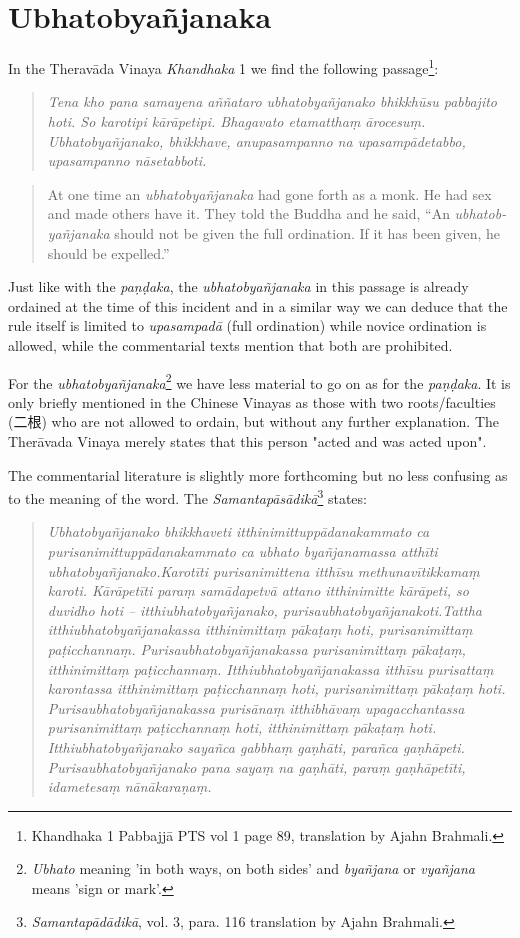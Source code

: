\section{Ubhatob­yañ­janaka}
In the Theravāda Vinaya {\em Khandhaka} 1 we find the following passage\footnote{Khandhaka 1 Pabbajjā PTS vol 1 page 89, translation by Ajahn Brahmali.}:

\begin{quote}
{\em Tena kho pana samayena aññataro ubhatobyañjanako bhikkhūsu pabbajito hoti. So karotipi kārāpetipi. Bhagavato etamatthaṃ ārocesuṃ. Ubhatobyañjanako, bhikkhave, anupasampanno na upasampādetabbo, upasampanno nāsetabboti.}
\end{quote}

\begin{quote}
At one time an {\em ubhatob­yañ­janaka} had gone forth as a monk. He had sex and made others have it. They told the Buddha and he said, “An {\em ubhatob­yañ­janaka} should not be given the full ordination. If it has been given, he should be expelled.”
\end{quote}

Just like with the {\em paṇḍaka}, the {\em ubhatob­yañ­janaka} in this passage is already ordained at the time of this incident and in a similar way we can deduce that the rule itself is limited to {\em upasampadā} (full ordination) while novice ordination is allowed, while the commentarial texts mention that both are prohibited.

For the {\em ubhatob­yañ­janaka}\footnote{{\em Ubhato} meaning 'in both ways, on both sides' and {\em byañjana} or {\em vyañjana} means 'sign or mark'.} we have less material to go on as for the {\em paṇḍaka}. It is only briefly mentioned in the Chinese Vinayas as those with two roots/faculties (二根) who are not allowed to ordain, but without any further explanation. The Therāvada Vinaya merely states that this person "acted and was acted upon". 

The commentarial literature is slightly more forthcoming but no less confusing as to the meaning of the word. The {\em Samantapāsādikā}\footnote{{\em Samantapādādikā}, vol. 3, para. 116 translation by Ajahn Brahmali.} states:

\begin{quote}
{\em Ubhatobyañjanako bhikkhaveti itthinimittuppādanakammato ca purisanimittuppādanakammato ca ubhato byañjanamassa atthīti ubhatobyañjanako.Karotīti purisanimittena itthīsu methunavītikkamaṃ karoti. Kārāpetīti paraṃ samādapetvā attano itthinimitte kārāpeti, so duvidho hoti – itthiubhatobyañjanako, purisaubhatobyañjanakoti.Tattha itthiubhatobyañjanakassa itthinimittaṃ pākaṭaṃ hoti, purisanimittaṃ paṭicchannaṃ. Purisaubhatobyañjanakassa purisanimittaṃ pākaṭaṃ, itthinimittaṃ paṭicchannaṃ. Itthiubhatobyañjanakassa itthīsu purisattaṃ karontassa itthinimittaṃ paṭicchannaṃ hoti, purisanimittaṃ pākaṭaṃ hoti. Purisaubhatobyañjanakassa purisānaṃ itthibhāvaṃ upagacchantassa purisanimittaṃ paṭicchannaṃ hoti, itthinimittaṃ pākaṭaṃ hoti. Itthiubhatobyañjanako sayañca gabbhaṃ gaṇhāti, parañca gaṇhāpeti. Purisaubhatobyañjanako pana sayaṃ na gaṇhāti, paraṃ gaṇhāpetīti, idametesaṃ nānākaraṇaṃ.}
\end{quote}

